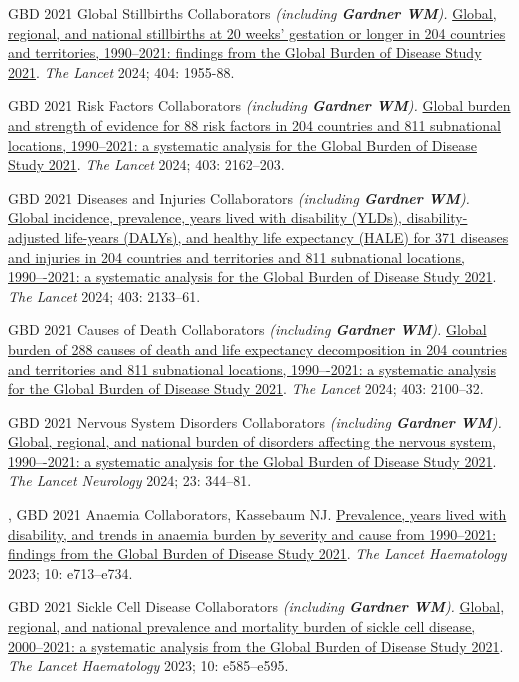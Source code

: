 \documentclass[11pt,article,oneside]{memoir}
\begin{document}
\ind GBD 2021 Global Stillbirths Collaborators \emph{(including \textbf{Gardner WM}).} \href{https://doi.org/10.1016/S0140-6736(24)01925-1}{Global, regional, and national stillbirths at 20 weeks' gestation or longer in 204 countries and territories, 
1990–2021: findings from the Global Burden of Disease Study 2021}. \emph{The Lancet} 2024; 404: 1955-88. 

\ind GBD 2021 Risk Factors Collaborators \emph{(including \textbf{Gardner WM}).} \href{https://doi.org/10.1016/S0140-6736(24)00933-4}{Global burden and strength of evidence for 88 risk factors in 204 countries and 811 subnational locations, 
1990–2021: a systematic analysis for the Global Burden of Disease Study 2021}. \emph{The Lancet} 2024; 403: 2162--203.

\ind GBD 2021 Diseases and Injuries Collaborators \emph{(including \textbf{Gardner WM}).} \href{https://doi.org/10.1016/S0140-6736(24)00757-8}{Global incidence, prevalence, years lived with disability (YLDs), disability-adjusted life-years (DALYs), 
and healthy life expectancy (HALE) for 371 diseases and injuries in 204 countries and territories and 811 subnational locations, 1990–-2021: a systematic analysis for the Global Burden of Disease Study 2021}. \emph{The Lancet} 2024; 403: 2133--61.

\ind GBD 2021 Causes of Death Collaborators \emph{(including \textbf{Gardner WM}).} \href{https://doi.org/10.1016/S0140-6736(24)00367-2}{Global burden of 288 causes of death and life expectancy decomposition in 204 countries and 
territories and 811 subnational locations, 1990–-2021: a systematic analysis for the Global Burden of Disease Study 2021}. \emph{The Lancet} 2024; 403: 2100--32.

\ind GBD 2021 Nervous System Disorders Collaborators \emph{(including \textbf{Gardner WM}).} \href{https://doi.org/10.1016/S1474-4422(24)00038-3}{Global, regional, and national burden of disorders affecting the nervous system, 
1990–-2021: a systematic analysis for the Global Burden of Disease Study 2021}. \emph{The Lancet Neurology} 2024; 23: 344--81. 

, GBD 2021 Anaemia Collaborators, Kassebaum NJ. \href{https://doi.org/10.1016/S2352-3026(23)00160-6}{Prevalence, years lived with disability, and trends in anaemia burden by severity 
and cause from 1990--2021: findings from the Global Burden of Disease Study 2021}. \emph{The Lancet Haematology} 2023; 10: e713--e734.

\ind GBD 2021 Sickle Cell Disease Collaborators \emph{(including \textbf{Gardner WM}).} \href{https://doi.org/10.1016/S2352-3026(23)00118-7}{Global, regional, and national prevalence and mortality burden of sickle cell disease, 2000--2021: 
a systematic analysis from the Global Burden of Disease Study 2021}. \emph{The Lancet Haematology} 2023; 10: e585--e595.
\end{document}
